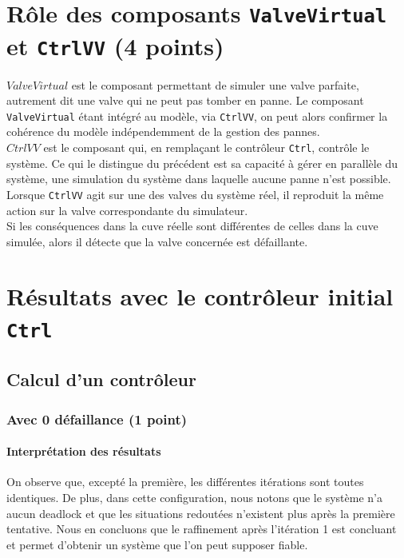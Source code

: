 \documentclass[a4paper]{book}
\begin{document}
\section{Rôle des composants {\tt ValveVirtual} et {\tt CtrlVV} (4 points)}

$ValveVirtual$ est le composant permettant de simuler une valve parfaite, autrement dit une valve qui ne peut pas tomber en panne. Le composant {\tt ValveVirtual} étant intégré au modèle, via {\tt CtrlVV}, on peut alors confirmer la cohérence du modèle indépendemment de la gestion des pannes. \\
$CtrlVV$ est le composant qui, en remplaçant le contrôleur {\tt Ctrl}, contrôle le système. Ce qui le distingue du précédent est sa capacité à gérer en parallèle du système, une simulation du système dans laquelle aucune panne n'est possible. \\
Lorsque {\tt CtrlVV} agit sur une des valves du système réel, il reproduit la même action sur la valve correspondante du simulateur. \\
Si les conséquences dans la cuve réelle sont différentes de celles dans la cuve simulée, alors il détecte que la valve concernée est défaillante.


\section{Résultats avec le contrôleur initial {\tt Ctrl}}

\subsection{Calcul d'un contrôleur}

\subsubsection{Avec 0 défaillance (1 point)}





\paragraph{Interprétation des résultats}

On observe que, excepté la première, les différentes itérations sont toutes identiques. De plus, dans cette configuration, nous notons que le système n'a aucun deadlock et que les situations redoutées n'existent plus après la première tentative. Nous en concluons que le raffinement après l'itération 1 est concluant et permet d'obtenir un système que l'on peut supposer fiable.
\end{document}
